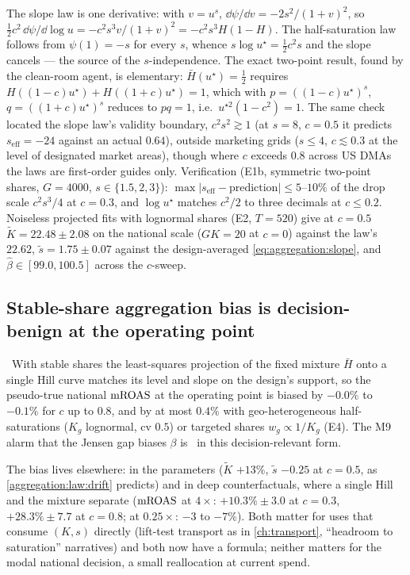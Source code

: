 The slope law is one derivative: with $v = u^s$, $\dd\psi/\dd v = -2s^2/(1+v)^2$, so $\tfrac12 c^2\,\dd\psi/\dd\log u = -c^2 s^3 v/(1+v)^2 = -c^2 s^3 H(1-H)$. The half-saturation law follows from $\psi(1) = -s$ for every $s$, whence $s\log u^\star = \tfrac12 c^2 s$ and the slope cancels --- the source of the $s$-independence. The exact two-point result, found by the clean-room agent, is elementary: $\bar H(u^\star) = \tfrac12$ requires $H((1-c)u^\star) + H((1+c)u^\star) = 1$, which with $p = ((1-c)u^\star)^s$, $q = ((1+c)u^\star)^s$ reduces to $pq = 1$, i.e.\ $u^{\star 2}(1 - c^2) = 1$. The same check located the slope law's validity boundary, $c^2 s^2 \gtrsim 1$ (at $s = 8$, $c = 0.5$ it predicts $s_{\mathrm{eff}} = -24$ against an actual $0.64$), outside marketing grids ($s \le 4$, $c \lesssim 0.3$ at the level of designated market areas), though where $c$ exceeds $0.8$ across US DMAs the laws are first-order guides only. Verification (E1b, symmetric two-point shares, $G = 4000$, $s \in \{1.5, 2, 3\}$): $\max|s_{\mathrm{eff}} - \text{prediction}| \le 5$--$10\%$ of the drop scale $c^2 s^3/4$ at $c = 0.3$, and $\log u^\star$ matches $c^2/2$ to three decimals at $c \le 0.2$. Noiseless projected fits with lognormal shares (E2, $T = 520$) give at $c = 0.5$ $\tilde K = 22.48 \pm 2.08$ on the national scale ($GK = 20$ at $c = 0$) against the law's $22.62$, $\tilde s = 1.75 \pm 0.07$ against the design-averaged \cref{eq:aggregation:slope}, and $\hat\beta \in [99.0, 100.5]$ across the $c$-sweep.

\subsection{Stable-share aggregation bias is decision-benign at the operating point}

\begin{proposition}\label{aggregation:prop:benign}
\tagNumerical\ With stable shares the least-squares projection of the fixed mixture $\bar H$ onto a single Hill curve matches its level and slope on the design's support, so the pseudo-true national $\mathrm{mROAS}$ at the operating point is biased by $-0.0\%$ to $-0.1\%$ for $c$ up to $0.8$, and by at most $0.4\%$ with geo-heterogeneous half-saturations ($K_g$ lognormal, cv $0.5$) or targeted shares $w_g \propto 1/K_g$ (E4). The M9 alarm that the Jensen gap biases $\beta$ is \tagRefuted\ in this decision-relevant form.
\end{proposition}

The bias lives elsewhere: in the parameters ($\tilde K$ $+13\%$, $\tilde s$ $-0.25$ at $c = 0.5$, as \cref{aggregation:law:drift} predicts) and in deep counterfactuals, where a single Hill and the mixture separate ($\mathrm{mROAS}$ at $4\times$: $+10.3\% \pm 3.0$ at $c = 0.3$, $+28.3\% \pm 7.7$ at $c = 0.8$; at $0.25\times$: $-3$ to $-7\%$). Both matter for uses that consume $(K,s)$ directly (lift-test transport as in \cref{ch:transport}, ``headroom to saturation'' narratives) and both now have a formula; neither matters for the modal national decision, a small reallocation at current spend.

